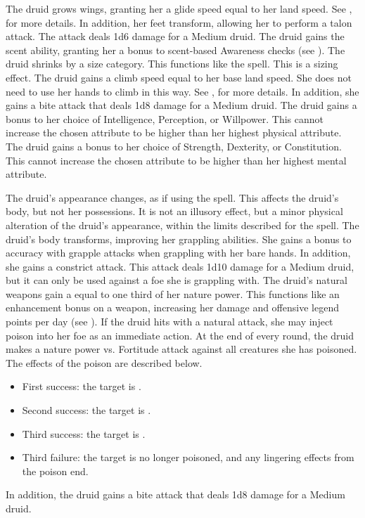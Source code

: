 The druid grows wings, granting her a glide speed equal to her land speed.
See , for more details.
In addition, her feet transform, allowing her to perform a talon attack.
The attack deals 1d6 damage for a Medium druid.
The druid gains the scent ability, granting her a  bonus to scent-based Awareness checks (see ).
The druid shrinks by a size category.
This functions like the  spell.
This is a sizing effect.
The druid gains a climb speed equal to her base land speed.
She does not need to use her hands to climb in this way.
See , for more details.
In addition, she gains a bite attack that deals 1d8 damage for a Medium druid.
The druid gains a  bonus to her choice of Intelligence, Perception, or Willpower.
This cannot increase the chosen attribute to be higher than her highest physical attribute.
The druid gains a  bonus to her choice of Strength, Dexterity, or Constitution.
This cannot increase the chosen attribute to be higher than her highest mental attribute.

The druid's appearance changes, as if using the  spell.
This affects the druid's body, but not her possessions.
It is not an illusory effect, but a minor physical alteration of the druid's appearance, within the limits described for the spell.
The druid's body transforms, improving her grappling abilities.
She gains a  bonus to accuracy with grapple attacks when grappling with her bare hands.
In addition, she gains a constrict attack.
This attack deals 1d10 damage for a Medium druid, but it can only be used against a foe she is grappling with.
The druid's natural weapons gain a  equal to one third of her nature power.
This functions like an enhancement bonus on a weapon, increasing her damage and offensive legend points per day (see ).
If the druid hits with a natural attack, she may inject poison into her foe as an immediate action.
At the end of every round, the druid makes a nature power vs. Fortitude attack against all creatures she has poisoned.
The effects of the poison are described below.
\begin{itemize}
    \item First success: the target is \sickened.
    \item Second success: the target is \staggered.
    \item Third success: the target is \nauseated.
    \item Third failure: the target is no longer poisoned, and any lingering effects from the poison end.
\end{itemize}
\par In addition, the druid gains a bite attack that deals 1d8 damage for a Medium druid.


